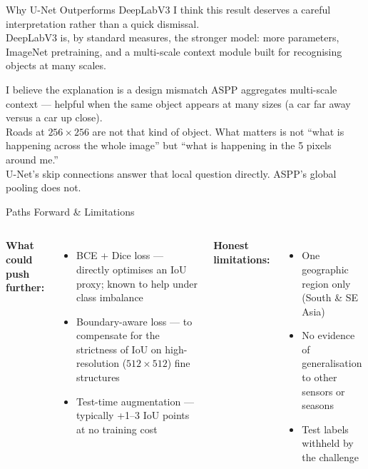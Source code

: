 \documentclass{beamer}
\begin{document}
\begin{frame}{Why U-Net Outperforms DeepLabV3}
  I think this result deserves a careful interpretation rather than a quick dismissal. \\[0.4em]
  DeepLabV3 is, by standard measures, the stronger model: more parameters, ImageNet
  pretraining, and a multi-scale context module built for recognising objects at many scales. \\[0.4em]
  \begin{block}{I believe the explanation is a design mismatch}
    ASPP aggregates multi-scale context --- helpful when the same object appears at
    many sizes (a car far away versus a car up close). \\[0.3em]
    Roads at $256\times256$ are not that kind of object.
    What matters is not ``what is happening across the whole image'' but
    ``what is happening in the 5 pixels around me.'' \\[0.3em]
    U-Net's skip connections answer that local question directly.
    ASPP's global pooling does not.
  \end{block}
\end{frame}

\begin{frame}{Paths Forward \& Limitations}
  \begin{columns}[T]
    \textbf{What could push further:}
    \begin{itemize}
      \item BCE + Dice loss --- directly optimises an IoU proxy; known to help under class imbalance
      \item Boundary-aware loss --- to compensate for the strictness of IoU on high-resolution ($512\times512$) fine structures
      \item Test-time augmentation --- typically +1--3 IoU points at no training cost
    \end{itemize}

    \textbf{Honest limitations:}
    \begin{itemize}
      \item One geographic region only (South \& SE Asia)
      \item No evidence of generalisation to other sensors or seasons
      \item Test labels withheld by the challenge
    \end{itemize}
  \end{columns}
\end{frame}
\end{document}
